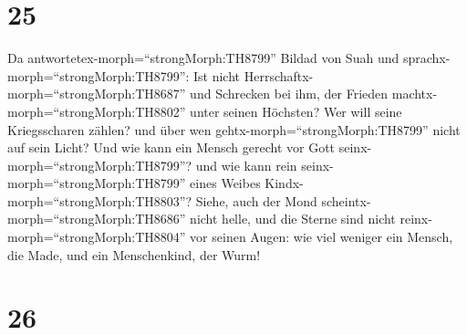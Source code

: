 \hypertarget{section-24}{%
\section{25}\label{section-24}}

 Da antwortetex-morph=``strongMorph:TH8799'' Bildad von Suah
und sprachx-morph=``strongMorph:TH8799'':  Ist nicht
Herrschaftx-morph=``strongMorph:TH8687'' und Schrecken bei ihm, der
Frieden machtx-morph=``strongMorph:TH8802'' unter seinen Höchsten?
 Wer will seine Kriegsscharen zählen? und über wen
gehtx-morph=``strongMorph:TH8799'' nicht auf sein Licht? 
Und wie kann ein Mensch gerecht vor Gott
seinx-morph=``strongMorph:TH8799''? und wie kann rein
seinx-morph=``strongMorph:TH8799'' eines Weibes
Kindx-morph=``strongMorph:TH8803''?  Siehe, auch der Mond
scheintx-morph=``strongMorph:TH8686'' nicht helle, und die Sterne sind
nicht reinx-morph=``strongMorph:TH8804'' vor seinen Augen: 
wie viel weniger ein Mensch, die Made, und ein Menschenkind, der Wurm!

\hypertarget{section-25}{%
\section{26}\label{section-25}}

